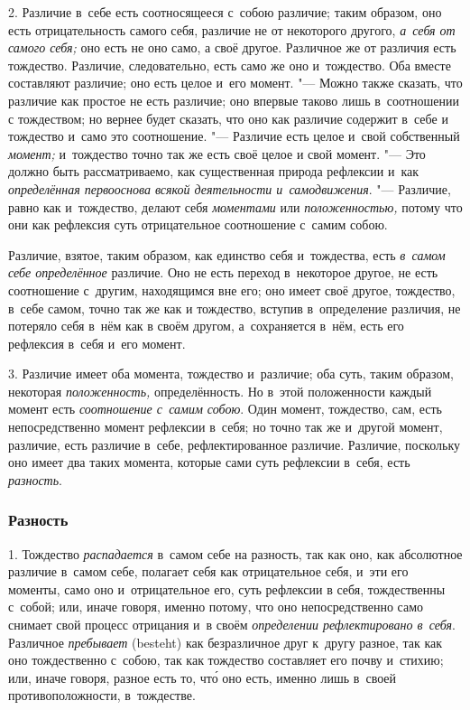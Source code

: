 2. Различие в~себе есть соотносящееся с~собою различие; таким образом, оно
есть отрицательность самого себя, различие не от некоторого другого,
{\em а~себя от самого себя;} оно есть не оно само, а
своё другое. Различное же от различия есть тождество. Различие,
следовательно, есть само же оно и~тождество. Оба вместе составляют
различие; оно есть целое и~его момент. "--- Можно также сказать, что различие
как простое не есть различие; оно впервые таково лишь в~соотношении с
тождеством; но вернее будет сказать, что оно как различие содержит в~себе и
тождество и~само это соотношение. "--- Различие есть целое и~свой собственный
{\em момент;} и~тождество точно так же есть своё целое
и свой момент. "--- Это должно быть рассматриваемо, как существенная природа
рефлексии и~как {\em определённая первооснова всякой
деятельности и~самодвижения}. "--- Различие, равно как и~тождество, делают
себя {\em моментами} или
{\em положенностью,} потому что они как рефлексия суть
отрицательное соотношение с~самим собою.

Различие, взятое, таким образом, как единство себя и~тождества, есть
{\em в~самом себе определённое} различие. Оно не есть
переход в~некоторое другое, не есть соотношение с~другим, находящимся вне
его; оно имеет своё другое, тождество, в~себе самом, точно так же как и
тождество, вступив в~определение различия, не потеряло себя в~нём как в
своём другом, а~сохраняется в~нём, есть его рефлексия в~себя и~его момент.

3. Различие имеет оба момента, тождество и~различие; оба суть, таким
образом, некоторая {\em положенность,} определённость.
Но в~этой положенности каждый момент есть
{\em соотношение с~самим собою}. Один момент,
тождество, сам, есть непосредственно момент рефлексии в~себя; но точно так
же и~другой момент, различие, есть различие в~себе, рефлектированное
различие. Различие, поскольку оно имеет два таких момента, которые сами
суть рефлексии в~себя, есть {\em разность}.

\subsubsection{Разность}
1. Тождество {\em распадается} в~самом себе на разность, так как
оно, как абсолютное различие в~самом себе, полагает себя как отрицательное
себя, и~эти его моменты, само оно и~отрицательное его, суть рефлексии в
себя, тождественны с~собой; или, иначе говоря, именно потому, что оно
непосредственно само снимает свой процесс отрицания и~в своём
{\em определении рефлектировано в~себя}. Различное
{\em пребывает} (besteht) как безразличное друг к~другу
разное, так как оно тождественно с~собою, так как тождество составляет его
почву и~стихию; или, иначе говоря, разное есть то, чт\'{о} оно есть, именно
лишь в~своей противоположности, в~тождестве.


